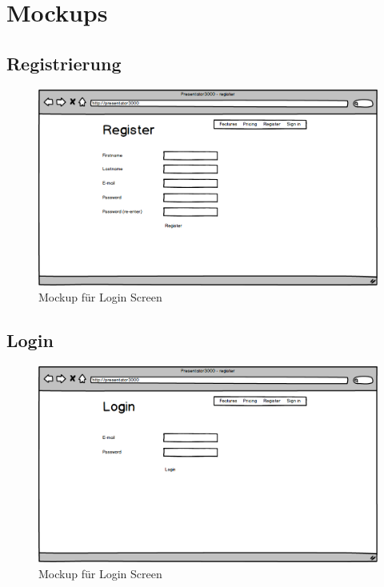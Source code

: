 \chapter{Mockups}
\label{chap:mockups}

\section{Registrierung}
\begin{figure}[H]
	\centering
    \includegraphics[width=1\textwidth]{images/mockup-register.png}
    \caption{Mockup für Login Screen}
\end{figure}

\section{Login}
\begin{figure}[H]
	\centering
    \includegraphics[width=1\textwidth]{images/mockup-login.png}
    \caption{Mockup für Login Screen}
\end{figure}

